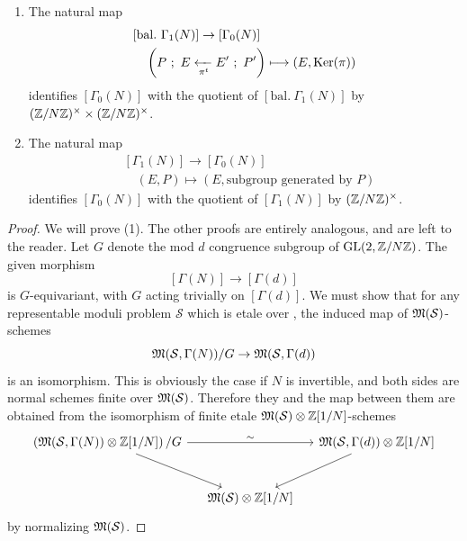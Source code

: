 \begin{kthm}
\begin{enumerate}[(1)]
\[\begin{aligned}
& \quad \left( P\ ;\ E \xrightarrow[\pi^t]{\pi} E'\ ;\ P' \right) \longmapsto (E, P)
\end{aligned}
\]
identifies $[\Gamma_1(N)]$ as the quotient of $[\mathrm{bal.}\ \Gamma_1(N)]$ by the subgroup $1 \times (\Z/N\Z)^\times$ of $(\Z/N\Z)^\times \times (\Z/N\Z)^\times$.
\item The natural map
\[
\begin{aligned}
& [\mathrm{bal.}\ \Gamma_1(N)] \to [\Gamma_0(N)] \\
& \quad \left( P\ ;\ E \xleftarrow[\pi^t]{} E'\ ;\ P' \right) \longmapsto (E, \operatorname{Ker}(\pi))
\end{aligned}
\]
identifies $[\Gamma_0(N)]$ with the quotient of $[\mathrm{bal.}\ \Gamma_1(N)]$ by $(\Z/N\Z)^\times \times (\Z/N\Z)^\times$.
\item The natural map
\[
\begin{aligned}
& [\Gamma_1(N)] \to [\Gamma_0(N)] \\
& \quad (E, P) \mapsto (E, \text{subgroup generated by } P)
\end{aligned}
\]
identifies $[\Gamma_0(N)]$ with the quotient of $[\Gamma_1(N)]$ by $(\mathbb{Z}/N\mathbb{Z})^\times$.
\end{enumerate}
\end{kthm}

\begin{proof}
We will prove (1). The other proofs are entirely analogous, and are left to the reader. Let $G$ denote the mod $d$ congruence subgroup of $\operatorname{GL}(2,\mathbb{Z}/N\mathbb{Z})$. The given morphism
\[
[\Gamma(N)] \to [\Gamma(d)]
\]
is $G$-equivariant, with $G$ acting trivially on $[\Gamma(d)]$. We must show that for any representable moduli problem $\mathcal{S}$ which is etale over \Ell, the induced map of $\mathfrak{M}(\mathcal{S})$-schemes
\[
\mathfrak{M}(\mathcal{S}, \Gamma(N))/G \to \mathfrak{M}(\mathcal{S}, \Gamma(d))
\]
is an isomorphism. This is obviously the case if $N$ is invertible, and both sides are normal schemes finite over $\mathfrak{M}(\mathcal{S})$. Therefore they and the map between them are obtained from the isomorphism of finite etale $\mathfrak{M}(\mathcal{S}) \otimes \mathbb{Z}[1/N]$-schemes
{\footnotesize
\[
\begin{tikzcd}[column sep=small, row sep=large, every label/.append style={font=\scriptsize}]
\left( \Mfrak(\mathcal{S}, \Gamma(N)) \otimes \Z[1/N] \right)/G \arrow[rr, "\sim"] \arrow[rd] & & \Mfrak(\mathcal{S}, \Gamma(d)) \otimes \Z[1/N] \arrow[ld] \\
& \Mfrak(\mathcal{S}) \otimes \Z[1/N] &
\end{tikzcd}
\]}
by normalizing $\mathfrak{M}(\mathcal{S})$.
\end{proof}

